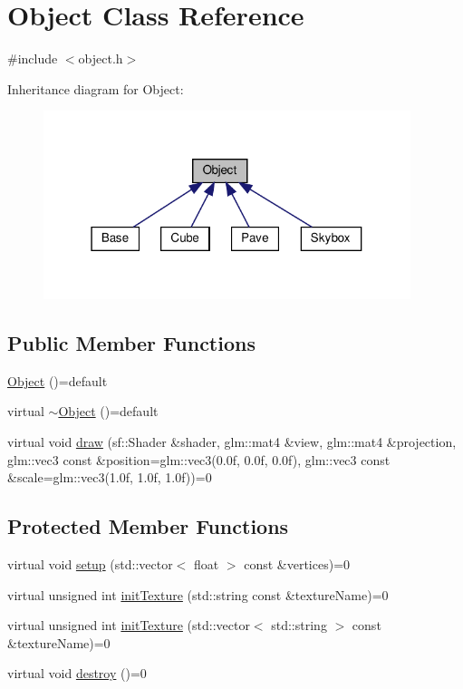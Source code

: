 \hypertarget{classObject}{}\section{Object Class Reference}
\label{classObject}


{\ttfamily \#include $<$object.\+h$>$}



Inheritance diagram for Object\+:\nopagebreak
\begin{figure}[H]
\begin{center}
\leavevmode
\includegraphics[width=304pt]{classObject__inherit__graph}
\end{center}
\end{figure}
\subsection*{Public Member Functions}
\begin{DoxyCompactItemize}
\item 
\hyperlink{classObject_afe9eeddd7068a37f62d3276a2fb49864}{Object} ()=default
\item 
virtual \hyperlink{classObject_a226f2ae2af766b77d83c09a4d766b725}{$\sim$\+Object} ()=default
\item 
virtual void \hyperlink{classObject_ab1ec4e4c64ac1564d9ccad7655cfaf82}{draw} (sf\+::\+Shader \&shader, glm\+::mat4 \&view, glm\+::mat4 \&projection, glm\+::vec3 const \&position=glm\+::vec3(0.\+0f, 0.\+0f, 0.\+0f), glm\+::vec3 const \&scale=glm\+::vec3(1.\+0f, 1.\+0f, 1.\+0f))=0
\end{DoxyCompactItemize}
\subsection*{Protected Member Functions}
\begin{DoxyCompactItemize}
\item 
virtual void \hyperlink{classObject_a262654508b0a6a8cd277911161c71024}{setup} (std\+::vector$<$ float $>$ const \&vertices)=0
\item 
virtual unsigned int \hyperlink{classObject_a12b8309292a39b028d5a7b1dfca98cb1}{init\+Texture} (std\+::string const \&texture\+Name)=0
\item 
virtual unsigned int \hyperlink{classObject_ac18935ff7831cb35dc462b581d2ccf3c}{init\+Texture} (std\+::vector$<$ std\+::string $>$ const \&texture\+Name)=0
\item 
virtual void \hyperlink{classObject_a69e91bef2c9f048aa4509329dc44948e}{destroy} ()=0
\end{DoxyCompactItemize}
